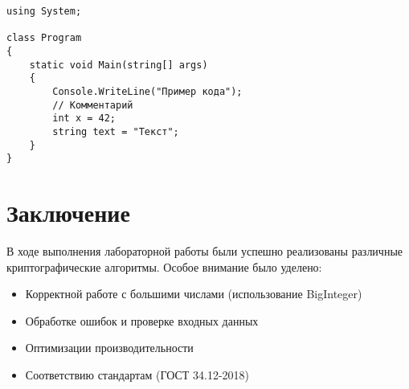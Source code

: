 \documentclass[a4paper, 14pt]{extarticle}
\begin{document}
\begin{lstlisting}[caption=Пример кода на C\#]
using System;

class Program
{
    static void Main(string[] args)
    {
        Console.WriteLine("Пример кода");
        // Комментарий
        int x = 42;
        string text = "Текст";
    }
}
\end{lstlisting}

\section{Заключение}
В ходе выполнения лабораторной работы были успешно реализованы различные криптографические алгоритмы. Особое внимание было уделено:
\begin{itemize}
    \item Корректной работе с большими числами (использование BigInteger)
    \item Обработке ошибок и проверке входных данных
    \item Оптимизации производительности
    \item Соответствию стандартам (ГОСТ 34.12-2018)
\end{itemize}
\end{document}
